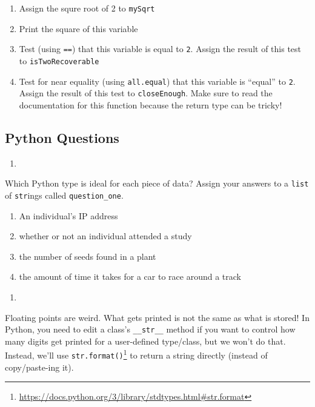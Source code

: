 \documentclass[
  12pt,
  krantz2]{krantz}
\providecommand{\tightlist}{%
  \setlength{\itemsep}{0pt}\setlength{\parskip}{0pt}}
\renewcommand{\href}[2]{#2\footnote{\url{#1}}}
\begin{document}
\begin{enumerate}
\def\labelenumi{\alph{enumi})}
\tightlist
\item
  Assign the squre root of 2 to \texttt{mySqrt}
\item
  Print the square of this variable
\item
  Test (using \texttt{==}) that this variable is equal to \texttt{2}. Assign the result of this test to \texttt{isTwoRecoverable}
\item
  Test for near equality (using \texttt{all.equal}) that this variable is ``equal'' to \texttt{2}. Assign the result of this test to \texttt{closeEnough}. Make sure to read the documentation for this function because the return type can be tricky!
\end{enumerate}

\hypertarget{python-questions}{%
\subsection{Python Questions}\label{python-questions}}

\begin{enumerate}
\def\labelenumi{\arabic{enumi}.}
\tightlist
\item
\end{enumerate}

Which Python type is ideal for each piece of data? Assign your answers to a \texttt{list} of \texttt{str}ings called \texttt{question\_one}.

\begin{enumerate}
\def\labelenumi{\alph{enumi})}
\tightlist
\item
  An individual's IP address
\item
  whether or not an individual attended a study
\item
  the number of seeds found in a plant
\item
  the amount of time it takes for a car to race around a track
\end{enumerate}

\begin{enumerate}
\def\labelenumi{\arabic{enumi}.}
\setcounter{enumi}{1}
\tightlist
\item
\end{enumerate}

Floating points are weird. What gets printed is not the same as what is stored! In Python, you need to edit a class's \texttt{\_\_str\_\_} method if you want to control how many digits get printed for a user-defined type/class, but we won't do that. Instead, we'll use \href{https://docs.python.org/3/library/stdtypes.html\#str.format}{\texttt{str.format()}} to return a string directly (instead of copy/paste-ing it).
\end{document}
